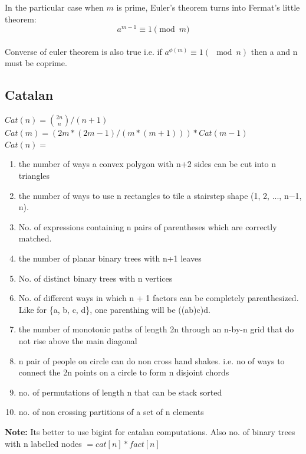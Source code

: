 \documentclass[8pt, a4paper, oneside, twocolumn]{extarticle}
\begin{document}
In the particular case when $m$ is prime, Euler's theorem turns into Fermat's little theorem: $$a^{m - 1} \equiv 1 \pmod m$$
\\Converse of euler theorem is also true i.e. if $a^{\phi(m)} \equiv 1 (\mod n)$ then a and n must be coprime.
\subsection{Catalan}
$Cat(n) = \binom{2n}{n} / (n + 1)$
\\$Cat(m) = (2m*(2m - 1)/(m*(m + 1))) * Cat(m - 1)$
\\$Cat(n) = $\begin{enumerate}
    \item the number of ways a convex polygon with n+2 sides can be cut into n triangles
    \item the number of ways to use n rectangles to tile a stairstep shape (1, 2, ..., n−1, n).
    \item No. of expressions containing n pairs of parentheses which are correctly matched.
    \item the number of planar binary trees with n+1 leaves
    \item No. of distinct binary trees with n vertices
    \item No. of different ways in which n + 1 factors can be completely parenthesized. Like for \{a, b, c, d\}, one parenthing will be ((ab)c)d.
    \item the number of monotonic paths of length 2n through an n-by-n grid that do not rise above the main diagonal
    \item n pair of people on circle can do non cross hand shakes. i.e. no of ways to connect the 2n points on a circle to form n disjoint chords
    \item no. of permutations of length n that can be stack sorted
    \item no. of non crossing partitions of a set of n elements
\end{enumerate}
\textbf{Note: }Its better to use bigint for catalan computations. Also no. of binary trees with n labelled nodes $= cat[n] * fact[n]$
\end{document}
